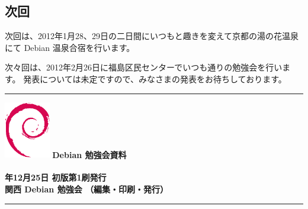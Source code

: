 \documentclass[mingoth,a4paper]{jsarticle}
\newcommand{\debmtgyear}{2011}
\newcommand{\debmtgdate}{25}
\newcommand{\debmtgmonth}{12}
\begin{document}
\clearpage
{}

\subsection{次回}
次回は、2012年1月28、29日の二日間にいつもと趣きを変えて京都の湯の花温泉
にて Debian 温泉合宿を行います。

次々回は、2012年2月26日に福島区民センターでいつも通りの勉強会を行います。
発表については未定ですので、みなさまの発表をお待ちしております。


\printindex
 \cleartooddpage

 \begin{minipage}[b]{0.2\hsize}
 \end{minipage}
 \begin{minipage}[b]{0.8\hsize}

 \vspace*{15cm}
 \rule{\hsize}{1mm}
 \vspace{2mm}
 \includegraphics[width=2cm]{image200502/openlogo-nd.eps}
 \noindent \Large \bf Debian 勉強会資料\\ \\
 \noindent \normalfont \debmtgyear{}年\debmtgmonth{}月\debmtgdate{}日 \hspace{5mm}  初版第1刷発行\\
 \noindent \normalfont 関西 Debian 勉強会 （編集・印刷・発行）\\
 \rule{\hsize}{1mm}
 \end{minipage}
\end{document}
